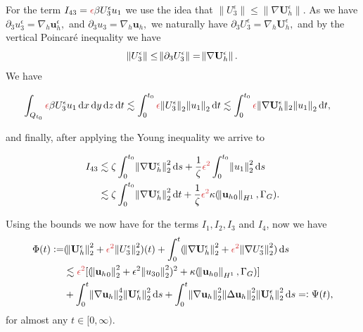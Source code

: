 \documentclass{beamer}
\newcommand*\diff{\mathop{}\!\mathrm{d}}
\begin{document}
\begin{frame}
For the term $ I_{43} = \textcolor{jasper}{\epsilon} \beta U_3^\epsilon u_1$ we use the idea that $\| U_3^\epsilon \| \leq \| \nabla \mathbf{U}_h^\epsilon \|.$ As we have $\partial_3 u_3^\epsilon = \nabla_h \mathbf{u}_h^\epsilon,$ and $\partial_3 u_3 = \nabla_h \mathbf{u}_h,$ we naturally have $\partial_3 U_3^\epsilon = \nabla_h \mathbf{U}_h^\epsilon,$ and by the vertical Poincar\'e inequality we have $$\norm{U_3^\epsilon} \leq \norm{\partial_3 U_3^\epsilon} = \norm{\nabla \mathbf{U}_h^\epsilon}.$$ We have
      
      $$ \hspace{-1em}\int_{Q_{t_0}} \textcolor{jasper}{\epsilon} \beta U_3^\epsilon u_1 \diff x \diff y \diff z \diff t \lesssim \int_0^{t_0} \textcolor{jasper}{\epsilon} \norm{U_3^\epsilon}_2 \norm{u_1}_2 \diff t \lesssim \int_0^{t_0} \textcolor{jasper}{\epsilon} \| \nabla \mathbf{U}_h^\epsilon \|_2 \norm{u_1}_2 \diff t, $$
      
      and finally, after applying the Young inequality we arrive to
      
      \begin{equation}\nonumber
        \begin{split}
          I_{43} & \lesssim \zeta \int_0^{t_0} \norm{\nabla \mathbf{U}_h^\epsilon}_2^2 \diff s+ \frac{1}{\zeta} \textcolor{jasper}{\epsilon^2} \int_0^{t_0} \norm{u_1}_2^2 \diff s \\
          & \lesssim \zeta \int_0^{t_0} \norm{\nabla \mathbf{U}_h^\epsilon}_2^2 \diff t + \frac{1}{\zeta} \textcolor{jasper}{\epsilon^2} \kappa (\norm{{\mathbf{u}_h}_0}_{H^1}, \Gamma_G).
        \end{split}
      \end{equation}
\end{frame}

\begin{frame}
Using the bounds we now have for the terms $I_1, I_2, I_3$ and $I_4$, now we have
%
\begin{equation}
  \begin{split} \nonumber
  \Phi (t):= & (\norm{\mathbf{U}_h^\epsilon}_2^2 + \textcolor{jasper}{\epsilon^2} \norm{U_3^\epsilon}_2^2)(t) + \int_0^t (\norm{\nabla \mathbf{U}_h^\epsilon}_2^2 + \textcolor{jasper}{\epsilon^2} \norm{\nabla U_3^\epsilon}_2^2) \diff s \\
  & \lesssim \textcolor{jasper}{\epsilon^2} [(\norm{{\mathbf{u}_h}_0}_2^2 + \epsilon^2 \norm{{u_3}_0}_2^2)^2 + \kappa (\norm{{\mathbf{u}_h}_0}_{H^1}, \Gamma_G)] \\
  & + \int_0^{t} \norm{\nabla \mathbf{u}_h}_2^4 \norm{\mathbf{U}_h^\epsilon}_2^2 \diff s + \int_0^{t} \norm{\nabla \mathbf{u}_h}_2^2  \norm{\Delta \mathbf{u}_h}_2^2 \norm{\mathbf{U}_h^\epsilon}_2^2 \diff s =: \Psi(t),
  \end{split}
\end{equation}
%
for almost any $t \in [0, \infty).$

\end{frame}
\end{document}
